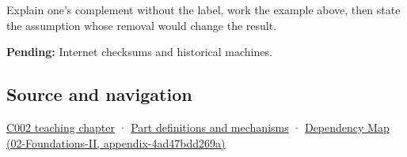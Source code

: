 Explain one's complement without the label, work the example above, then state the assumption whose removal would change the result.

\textbf{Pending:} Internet checksums and historical machines.

\subsection{Source and navigation}\label{source-and-navigation}

\href{Continuous\%20Notes/Computing\%20Foundations\%20-\%20From\%20Bits\%20to\%20C++\%20and\%20Systems\%20APIs\#Arithmetic\%20becomes\%20a\%20policy}{C002 teaching chapter} · \hyperref[appendix-fd090d982a15]{Part definitions and mechanisms} · \href{}{Dependency Map (02-Foundations-II, appendix-4ad47bdd269a)}
